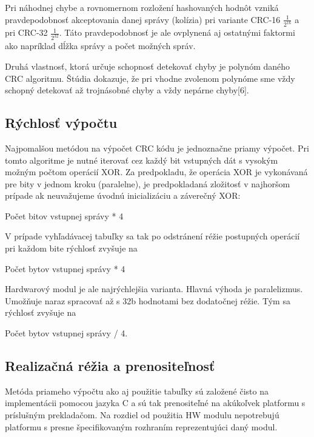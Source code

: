 \documentclass[11pt,a4paper]{article}
\begin{document}
\noindent Pri náhodnej chybe a rovnomernom rozložení hashovaných hodnôt vzniká pravdepodobnosť akceptovania danej správy (kolízia) pri variante CRC-16 $\frac{1}{2^{16}}$ a pri CRC-32 $\frac{1}{2^{32}}$. Táto pravdepodobnosť je ale ovplynená aj ostatnými faktormi ako napríklad dĺžka správy a počet možných správ.

\noindent Druhá vlastnosť, ktorá určuje schopnosť detekovať chyby je polynóm daného CRC algoritmu. Štúdia dokazuje, že pri vhodne zvolenom polynóme sme vždy schopný detekovať až trojnásobné chyby a vždy nepárne chyby[6].

\subsection{Rýchlosť výpočtu}

Najpomalšou metódou na výpočet CRC kódu je jednoznačne priamy výpočet. Pri tomto algoritme je nutné iterovať cez každý bit vstupných dát s vysokým možným počtom operácií XOR. Za predpokladu, že operácia XOR je vykonávaná pre bity v jednom kroku (paralelne), je predpokladaná zložitosť v najhoršom prípade ak neuvažujeme úvodnú inicializáciu a záverečný XOR:

\begin{center}
Počet bitov vstupnej správy * 4
\end{center}


\noindent V prípade vyhľadávacej tabuľky sa tak po odstránení réžie postupných operácií pri každom bite rýchlosť zvyšuje na 

\begin{center}
Počet bytov vstupnej správy * 4
\end{center}

\noindent Hardwarový modul je ale najrýchlejšia varianta. Hlavná výhoda je paralelizmus. Umožňuje naraz spracovať až s 32b hodnotami bez dodatočnej réžie. Tým sa rýchlosť zvyšuje na 

\begin{center}
Počet bytov vstupnej správy / 4.
\end{center}

\subsection{Realizačná réžia a prenositeľnosť}

Metóda priameho výpočtu ako aj použitie tabuľky sú založené čisto na implementácii pomocou jazyka C a sú tak prenositeľné na akúkoľvek platformu s príslušným prekladačom. Na rozdiel od použitia HW modulu nepotrebujú platformu s presne špecifikovaným rozhraním reprezentujúci daný modul.\\
\end{document}
